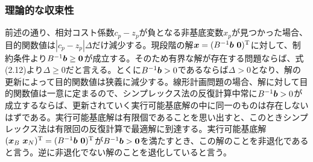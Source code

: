 \documentclass[dvipdfmx, 9pt, a4paper]{jsarticle}
\numberwithin{equation}{section}
\newcommand{\bm}[1]{{\mbox{\boldmath $#1$}}}
\begin{document}
\subsubsection{理論的な収束性}
前述の通り、相対コスト係数$c_p-z_p$が負となる非基底変数$x_p$が見つかった場合、目的関数値は$|c_p-z_p|\Delta$だけ減少する。現段階の解$\bm x=(B^{-1}\bm b~\bm 0)^{\rm T}$に対して、制約条件より$B^{-1}\bm b \geq \bm 0$が成立する。そのため有界な解が存在する問題ならば、式(2.12)より$\Delta \geq 0$だと言える。とくに$B^{-1}\bm b>0$であるならば$\Delta>0$となり、解の更新によって目的関数値は狭義に減少する。線形計画問題の場合、解に対して目的関数値は一意に定まるので、シンプレックス法の反復計算中常に$B^{-1}\bm b>0$が成立するならば、更新されていく実行可能基底解の中に同一のものは存在しないはずである。実行可能基底解は有限個であることを思い出すと、このときシンプレックス法は有限回の反復計算で最適解に到達する。実行可能基底解$(\bm x_B~\bm x_N)^{\rm T}=(B^{-1}\bm b~\bm 0)^{\rm T}$が$B^{-1}\bm b>\bm 0$を満たすとき、この解のことを非退化であると言う。逆に非退化でない解のことを退化していると言う。
\end{document}
